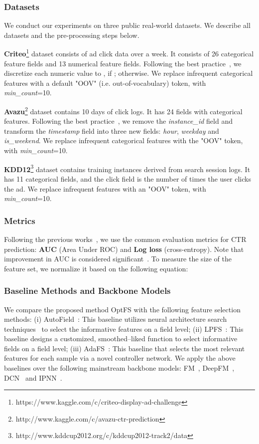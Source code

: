 \documentclass[sigconf]{acmart}
\begin{document}
\subsubsection{Datasets}
We conduct our experiments on three public real-world datasets. We describe all datasets and the pre-processing steps below.

\textbf{Criteo}\footnote{https://www.kaggle.com/c/criteo-display-ad-challenge} dataset consists of ad click data over a week. It consists of 26 categorical feature fields and 13 numerical feature fields. Following the best practice~\cite{fuxictr}, we discretize each numeric value  to , if ;  otherwise. We replace infrequent categorical features with a default "OOV" (i.e. out-of-vocabulary) token, with \textit{min\_count}=10.

\textbf{Avazu}\footnote{http://www.kaggle.com/c/avazu-ctr-prediction} dataset contains 10 days of click logs. It has 24 fields with categorical features. Following the best practice~\cite{fuxictr}, we remove the \textit{instance\_id} field and transform the \textit{timestamp} field into three new fields: \textit{hour}, \textit{weekday} and \textit{is\_weekend}. We replace infrequent categorical features with the "OOV" token, with \textit{min\_count}=10.

\textbf{KDD12}\footnote{http://www.kddcup2012.org/c/kddcup2012-track2/data} dataset contains training instances derived from search session logs. It has 11 categorical fields, and the click field is the number of times the user clicks the ad. We replace infrequent features with an "OOV" token, with \textit{min\_count}=10.

\subsubsection{Metrics}
Following the previous works~\cite{FM,DeepFM}, we use the common evaluation metrics for CTR prediction: \textbf{AUC} (Area Under ROC) and \textbf{Log loss} (cross-entropy). Note that  improvement in AUC is considered significant~\cite{IPNN, DeepFM}. To measure the size of the feature set, we normalize it based on the following equation:


\subsubsection{Baseline Methods and Backbone Models}
We compare the proposed method OptFS with the following feature selection methods: (i) AutoField~\cite{AutoField}: This baseline utilizes neural architecture search techniques~\cite{DARTS} to select the informative features on a field level; (ii) LPFS~\cite{LPFS}: This baseline designs a customized, smoothed--liked function to select informative fields on a field level; (iii) AdaFS~\cite{AdaFS}: This baseline that selects the most relevant features for each sample via a novel controller network. We apply the above baselines over the following mainstream backbone models: FM~\cite{FM}, DeepFM~\cite{DeepFM}, DCN~\cite{DCN} and IPNN~\cite{IPNN}.
\end{document}
